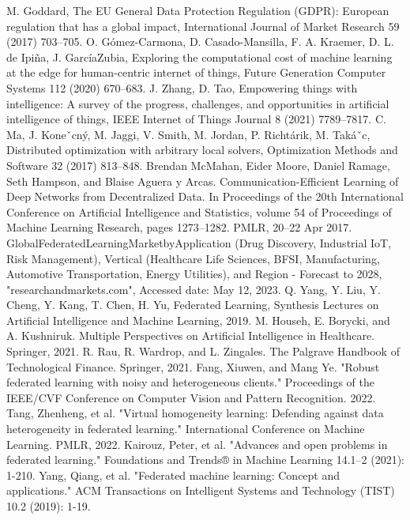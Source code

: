 \documentclass[conference]{IEEEtran}
\begin{document}
\begin{thebibliography}{00}
     M. Goddard, The EU General Data Protection Regulation (GDPR): European regulation that has a global impact, International Journal of Market Research 59 (2017) 703–705.
     O. Gómez-Carmona, D. Casado-Mansilla, F. A. Kraemer, D. L. de Ipiña, J. GarcíaZubia, Exploring the computational cost of machine learning at the edge for human-centric internet of things, Future Generation Computer Systems 112 (2020) 670–683.
     J. Zhang, D. Tao, Empowering things with intelligence: A survey of the progress, challenges, and opportunities in artificial intelligence of things, IEEE Internet of Things Journal 8 (2021) 7789–7817.
     C. Ma, J. Koneˇcný, M. Jaggi, V. Smith, M. Jordan, P. Richtárik, M. Takáˇc, Distributed optimization with arbitrary local solvers, Optimization Methods and Software 32 (2017) 813–848.
     Brendan McMahan, Eider Moore, Daniel Ramage, Seth Hampson, and Blaise Aguera y Arcas. Communication-Efficient Learning of Deep Networks from Decentralized Data. In Proceedings of the 20th International Conference on Artificial Intelligence and Statistics, volume 54 of Proceedings of Machine Learning Research, pages 1273–1282. PMLR, 20–22 Apr 2017.
     GlobalFederatedLearningMarketbyApplication (Drug Discovery, Industrial IoT, Risk Management), Vertical (Healthcare  Life Sciences, BFSI, Manufacturing, Automotive Transportation, Energy  Utilities), and Region - Forecast to 2028, "researchandmarkets.com", Accessed date: May 12, 2023.
     Q. Yang, Y. Liu, Y. Cheng, Y. Kang, T. Chen, H. Yu, Federated Learning, Synthesis Lectures on Artificial Intelligence and Machine Learning, 2019.
     M. Househ, E. Borycki, and A. Kushniruk. Multiple Perspectives on Artificial Intelligence in Healthcare. Springer, 2021.
     R. Rau, R. Wardrop, and L. Zingales. The Palgrave Handbook of Technological Finance. Springer, 2021.
     Fang, Xiuwen, and Mang Ye. "Robust federated learning with noisy and heterogeneous clients." Proceedings of the IEEE/CVF Conference on Computer Vision and Pattern Recognition. 2022.
     Tang, Zhenheng, et al. "Virtual homogeneity learning: Defending against data heterogeneity in federated learning." International Conference on Machine Learning. PMLR, 2022.
     Kairouz, Peter, et al. "Advances and open problems in federated learning." Foundations and Trends® in Machine Learning 14.1–2 (2021): 1-210.
     Yang, Qiang, et al. "Federated machine learning: Concept and applications." ACM Transactions on Intelligent Systems and Technology (TIST) 10.2 (2019): 1-19.

\end{thebibliography}
\end{document}
